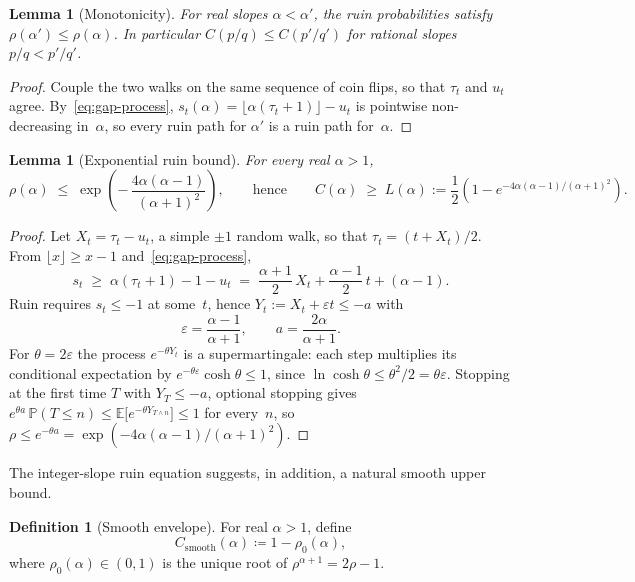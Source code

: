 \documentclass[11pt]{article}
\newtheorem{lemma}[theorem]{Lemma}
\theoremstyle{definition}
\newtheorem{definition}[theorem]{Definition}
\theoremstyle{remark}
\newcommand{\floor}[1]{\lfloor #1 \rfloor}
\begin{document}
\begin{lemma}[Monotonicity]\label{lem:mono}
For real slopes $\alpha < \alpha'$, the ruin probabilities satisfy
$\rho(\alpha') \leq \rho(\alpha)$.
In particular $C(p/q) \leq C(p'/q')$ for rational slopes
$p/q < p'/q'$.
\end{lemma}

\begin{proof}
Couple the two walks on the same sequence of coin flips, so that
$\tau_t$ and $u_t$ agree.
By~\eqref{eq:gap-process}, $s_t(\alpha) = \floor{\alpha(\tau_t + 1)}
- u_t$ is pointwise non-decreasing in~$\alpha$, so every ruin path
for $\alpha'$ is a ruin path for~$\alpha$.
\end{proof}

\begin{lemma}[Exponential ruin bound]\label{lem:lundberg}
For every real $\alpha > 1$,
\[
\rho(\alpha) \;\leq\;
\exp\!\left(-\,\frac{4\alpha(\alpha-1)}{(\alpha+1)^2}\right),
\qquad\text{hence}\qquad
C(\alpha) \;\geq\; L(\alpha) :=
\frac{1}{2}\left(1 - e^{-4\alpha(\alpha-1)/(\alpha+1)^2}\right).
\]
\end{lemma}

\begin{proof}
Let $X_t = \tau_t - u_t$, a simple $\pm 1$ random walk, so that
$\tau_t = (t + X_t)/2$.
From $\floor{x} \geq x - 1$ and~\eqref{eq:gap-process},
\[
s_t \;\geq\; \alpha(\tau_t + 1) - 1 - u_t
\;=\; \frac{\alpha+1}{2}\,X_t + \frac{\alpha-1}{2}\,t + (\alpha - 1).
\]
Ruin requires $s_t \leq -1$ at some~$t$, hence
$Y_t := X_t + \varepsilon t \leq -a$ with
\[
\varepsilon = \frac{\alpha-1}{\alpha+1},
\qquad
a = \frac{2\alpha}{\alpha+1}.
\]
For $\theta = 2\varepsilon$ the process $e^{-\theta Y_t}$ is a
supermartingale: each step multiplies its conditional expectation by
$e^{-\theta\varepsilon}\cosh\theta \leq 1$, since
$\ln\cosh\theta \leq \theta^2/2 = \theta\varepsilon$.
Stopping at the first time $T$ with $Y_T \leq -a$, optional stopping
gives $e^{\theta a}\,\mathbb{P}(T \leq n) \leq
\mathbb{E}\bigl[e^{-\theta Y_{T \wedge n}}\bigr] \leq 1$ for
every~$n$, so
$\rho \leq e^{-\theta a} = \exp(-4\alpha(\alpha-1)/(\alpha+1)^2)$.
\end{proof}

The integer-slope ruin equation suggests, in addition, a natural
smooth upper bound.

\begin{definition}[Smooth envelope]\label{def:smooth}
For real $\alpha > 1$, define
\[
C_{\mathrm{smooth}}(\alpha) \coloneqq 1 - \rho_0(\alpha),
\]
where $\rho_0(\alpha) \in (0,1)$ is the unique root of
$\rho^{\alpha+1} = 2\rho - 1$.
\end{definition}
\end{document}
